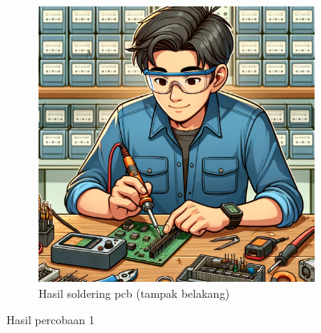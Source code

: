\begin{figure}[H]
\begin{subfigure}[c]{0.4\linewidth}
    \includegraphics[width=\linewidth]{img/modul_1/contohgambar.png}
    \caption{Hasil soldering pcb (tampak belakang) \label{fig:inisub2}}
  \end{subfigure}
  \caption{Hasil percobaan 1 \label{fig:keduagambar}}
\end{figure}